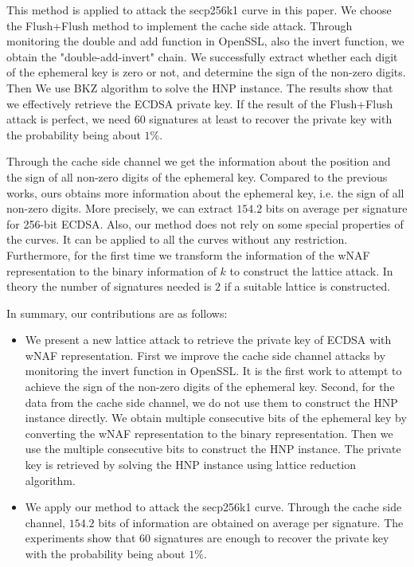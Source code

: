 This method is applied to attack the secp256k1 curve in this paper.
We choose the Flush+Flush\cite{gruss2016flush} method to implement the cache side attack.
Through monitoring the double and add function in OpenSSL, also the  invert function, we obtain the "double-add-invert" chain.
We successfully extract whether each digit of the ephemeral key is zero or not, and determine the sign of the non-zero digits.
Then We use BKZ \cite{Schnorr1994} algorithm to solve the HNP instance.
The results show that we effectively retrieve the ECDSA private key.
If the result of the Flush+Flush attack is perfect, we need $60$ signatures at least to recover the private key with the probability being about $1\%$.

Through the cache side channel we get the information about the position and the sign of all non-zero digits of the ephemeral key.
Compared to the previous works, ours obtains more information about the ephemeral key, i.e. the sign of all non-zero digits.
 More precisely, we can extract $154.2$ bits on average per signature for 256-bit ECDSA.
Also, our method does not rely on some special properties of the curves.
It  can be applied to all the curves without any restriction.
Furthermore,  for the first time we transform the information of the wNAF representation to the binary information of $k$ to construct the lattice attack.
In theory the number of signatures needed is $2$ if a suitable lattice is constructed.






In summary, our contributions are as follows:
\begin{itemize}
  \item
  We present a new lattice attack to retrieve the private key of ECDSA with wNAF representation.
  First we
    improve the cache side channel attacks by monitoring
      the invert function in OpenSSL.
      It is the first work to attempt to achieve the sign of the non-zero digits of the ephemeral key.
   Second, for the data from the cache side channel, we do not use them to construct the HNP instance directly.
    We obtain multiple consecutive bits of the ephemeral key by converting the wNAF representation to the binary representation.
    Then we use the multiple consecutive bits to construct the HNP instance.
The private key is retrieved by solving the HNP instance using lattice reduction algorithm.

  \item
    We apply our method to attack the secp256k1 curve.
     Through the cache side channel, $154.2$ bits of information are obtained on average per signature.
    The experiments show that $60$ signatures are enough to recover the private key with the probability being about $1\%$.
\end{itemize}

